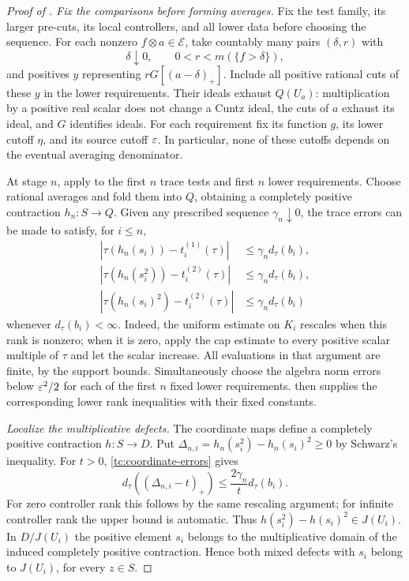 \begin{proof}[Proof of ]
\smallskip\noindent\emph{Fix the comparisons before forming averages.} 
Fix the test family, its larger pre-cuts, its local controllers, and
all lower data before choosing the sequence.  For each nonzero
$f\otimes a\in\mathcal E$, take countably many pairs $(\delta,r)$
with
\[
 \delta\downarrow0,\qquad 0<r<m(\{f>\delta\}),
\]
and positives $y$ representing $rG[(a-\delta)_+]$.  Include all
positive rational cuts of these $y$ in the lower requirements.  Their
ideals exhaust $Q(U_a)$: multiplication by a positive real scalar
does not change a Cuntz ideal, the cuts of $a$ exhaust its ideal, and
$G$ identifies ideals.  For each requirement fix its function $g$,
its lower cutoff $\eta$, and its source cutoff $\varepsilon$.  In particular,
none of these cutoffs depends on the eventual averaging denominator.

At stage $n$, apply  to the first $n$ trace
tests and first $n$ lower requirements.  Choose rational averages and
fold them into $Q$, obtaining a completely positive contraction
$h_n:S\to Q$.  Given any prescribed sequence $\gamma_n\downarrow0$,
the trace errors can be made to satisfy, for $i\leq n$,
\begin{equation}\label{tc:coordinate-errors}
 \begin{split}
 |\tau(h_n(s_i))-t_i^{(1)}(\tau)|
        &\leq\gamma_n d_\tau(b_i),\\
 |\tau(h_n(s_i^2))-t_i^{(2)}(\tau)|
        &\leq\gamma_n d_\tau(b_i),\\
 |\tau(h_n(s_i)^2)-t_i^{(2)}(\tau)|
        &\leq\gamma_n d_\tau(b_i)
 \end{split}
\end{equation}
whenever $d_\tau(b_i)<\infty$.  Indeed, the uniform estimate on $K_i$
rescales when this rank is nonzero; when it is zero, apply the cap
estimate to every positive scalar multiple of $\tau$ and let the
scalar increase.  All evaluations in that argument are finite, by
the support bounds.  Simultaneously choose the algebra norm errors
below $\varepsilon^2/2$ for each of the first $n$ fixed lower requirements.
 then supplies the corresponding lower rank
inequalities with their fixed constants.

\smallskip\noindent\emph{Localize the multiplicative defects.} 
The coordinate maps define a completely positive contraction
$h:S\to D$.  Put
$\Delta_{n,i}=h_n(s_i^2)-h_n(s_i)^2\geq0$ by Schwarz's inequality.
For $t>0$, \eqref{tc:coordinate-errors} gives
\begin{equation}\label{tc:defect-rank}
 d_\tau((\Delta_{n,i}-t)_+)
       \leq\frac{2\gamma_n}{t}d_\tau(b_i).
\end{equation}
For zero controller rank this follows by the same rescaling argument;
for infinite controller rank the upper bound is automatic.  Thus
$h(s_i^2)-h(s_i)^2\in J(U_i)$.  In $D/J(U_i)$ the positive element
$s_i$ belongs to the multiplicative domain of the induced completely
positive contraction.  Hence both mixed defects with $s_i$ belong
to $J(U_i)$, for every $z\in S$.


\end{proof}
